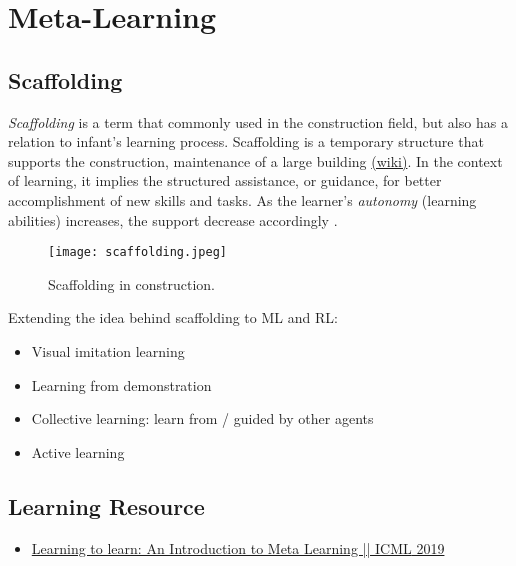 \chapter{Meta-Learning}

 

\section{Scaffolding}
\textit{Scaffolding} is a term that commonly used in the construction field, but also has a relation to infant's learning process. Scaffolding is a temporary structure that supports the construction, maintenance of a large building \href{https://en.wikipedia.org/wiki/Scaffolding}{(wiki)}. In the context of learning, it implies the structured assistance, or guidance, for better accomplishment of new skills and tasks. As the learner's \textit{autonomy} (learning abilities) increases, the support decrease accordingly . \cite{parentlab2019ccaffolding, zaadnoordijk2020next}

\begin{figure}[hbt!]
	\centering
	\texttt{[image: scaffolding.jpeg]}
	\caption{Scaffolding in construction.}
\end{figure}

Extending the idea behind scaffolding to \ac{ML} and \ac{RL}: \cite{zaadnoordijk2020next}
\begin{itemize}
	\item Visual imitation learning \cite{finn2017one, sharma2019third}
	\item Learning from demonstration \todo{}
	\item Collective learning: learn from / guided by other agents
	\item Active learning
\end{itemize}




\section{Learning Resource}
\begin{itemize}
	\item \href{https://youtu.be/ByeRnmHJ-uk}{Learning to learn: An Introduction to Meta Learning || \ac{ICML} 2019}
\end{itemize}

